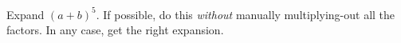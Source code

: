 Expand $(a+b)^5$.  If possible, do this \emph{without} manually multiplying-out all the factors.  In any case, get the right expansion.